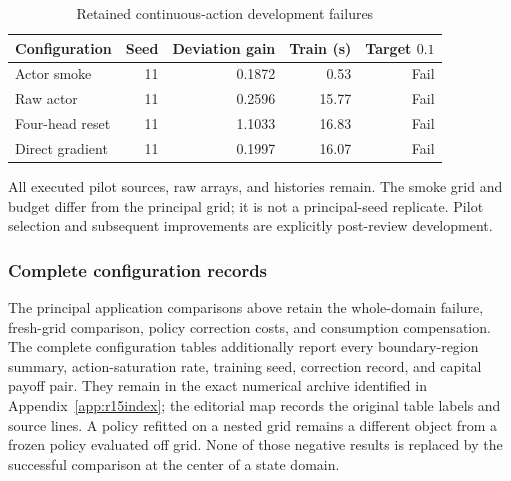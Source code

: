 \begin{table}[htbp]\centering
\caption{Retained continuous-action development failures}
\begin{small}\begin{tabular}{lrrrr}
\toprule
Configuration & Seed & Deviation gain & Train (s) & Target $0.1$ \\
\midrule
Actor smoke & 11 & 0.1872 & 0.53 & Fail \\
Raw actor & 11 & 0.2596 & 15.77 & Fail \\
Four-head reset & 11 & 1.1033 & 16.83 & Fail \\
Direct gradient & 11 & 0.1997 & 16.07 & Fail \\
\bottomrule\end{tabular}\end{small}
\par\smallskip\begin{minipage}{0.96\linewidth}\footnotesize All executed pilot sources, raw arrays, and histories remain. The smoke grid and budget differ from the principal grid; it is not a principal-seed replicate. Pilot selection and subsequent improvements are explicitly post-review development.\end{minipage}
\end{table}



\subsubsection{Complete configuration records}
The principal application comparisons above retain the whole-domain failure,
fresh-grid comparison, policy correction costs, and consumption compensation.
The complete configuration tables additionally report every boundary-region
summary, action-saturation rate, training seed, correction record, and capital
payoff pair. They remain in the exact numerical archive identified in
Appendix~\ref{app:r15index}; the editorial map records the original table
labels and source lines. A policy refitted on a nested grid remains a different
object from a frozen policy evaluated off grid. None of those negative results
is replaced by the successful comparison at the center of a state domain.
